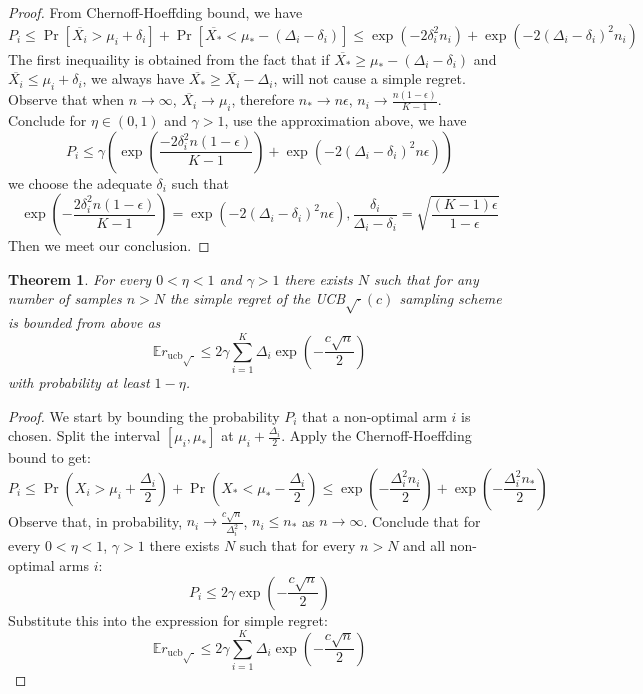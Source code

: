 \documentclass[11pt]{article}
\theoremstyle{definitionstyle}
\newtheorem{thm}{Theorem}
\newenvironment{framedminipage}
    {\begin{framed}\begin{minipage}{0.9\textwidth}}
    {\end{minipage}\end{framed}}
\begin{document}
\begin{proof}
From Chernoff-Hoeffding bound, we have
\[
    P_i\le\Pr[\overline{X_i}>\mu_i+\delta_i]+\Pr[\overline{X_*}<\mu_*-(\Delta_i-\delta_i)]\le\exp(-2\delta_i^2n_i)+\exp(-2(\Delta_i-\delta_i)^2n_i)
\]
The first inequaility is obtained from the fact that if $\overline{X_*}\ge\mu_*-(\Delta_i-\delta_i)$ and $\overline{X_i}\le\mu_i+\delta_i$, we always have $\overline{X_*}\ge\overline{X_i}-\Delta_i$, will not cause a simple regret.\\
Observe that when $n\to\infty$, $\overline{X_i}\to\mu_i$, therefore $n_*\to n\epsilon$, $n_i\to \frac{n(1-\epsilon)}{K-1}$.\\
Conclude for $\eta\in(0,1)$ and $\gamma>1$, use the approximation above, we have
\[
    P_i\le\gamma\left(\exp(\frac{-2\delta_i^2n(1-\epsilon)}{K-1})+\exp(-2(\Delta_i-\delta_i)^2n\epsilon)\right)
\]
we choose the adequate $\delta_i$ such that
\[
    \exp(-\frac{2\delta_i^2n(1-\epsilon)}{K-1})=\exp(-2(\Delta_i-\delta_i)^2n\epsilon),
    \frac{\delta_i}{\Delta_i-\delta_i}=\sqrt{\frac{(K-1)\epsilon}{1-\epsilon}}
\]
Then we meet our conclusion.
\end{proof}
\begin{framedminipage}
\begin{thm}
For every $0 < \eta < 1$ and $\gamma > 1$ there exists $N$ such that for any number of samples $n > N$ the simple regret of the UCB$\sqrt{\cdot}(c)$ sampling scheme is bounded from above as
\[
\mathbb{E}r_{\text{ucb}\sqrt{\cdot}} \le 2\gamma \sum_{i=1}^K \Delta_i \exp\left( -\frac{c\sqrt{n}}{2} \right)
\]
with probability at least $1 - \eta$.
\end{thm}
\end{framedminipage}
\begin{proof}
We start by bounding the probability $P_i$ that a non-optimal arm $i$ is chosen. Split the interval $[\mu_i, \mu_*]$ at $\mu_i + \frac{\Delta_i}{2}$. Apply the Chernoff-Hoeffding bound to get:
\[
P_i \le \Pr\left( X_i > \mu_i + \frac{\Delta_i}{2} \right) + \Pr\left( X_* < \mu_* - \frac{\Delta_i}{2} \right) \le \exp\left( -\frac{\Delta_i^2 n_i}{2} \right) + \exp\left( -\frac{\Delta_i^2 n_*}{2} \right)
\]
Observe that, in probability, $n_i \to \frac{c\sqrt{n}}{\Delta_i^2}$, $n_i \le n_*$ as $n \to \infty$. Conclude that for every $0 < \eta < 1$, $\gamma > 1$ there exists $N$ such that for every $n > N$ and all non-optimal arms $i$:
\[
P_i \le 2\gamma \exp\left( -\frac{c\sqrt{n}}{2} \right)
\]
Substitute this into the expression for simple regret:
\[
\mathbb{E}r_{\text{ucb}\sqrt{\cdot}} \le 2\gamma \sum_{i=1}^K \Delta_i \exp\left( -\frac{c\sqrt{n}}{2} \right)
\]
\end{proof}
\end{document}
